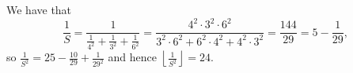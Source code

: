 We have that \[\frac{1}{S}=\frac{1}{\frac{1}{4^2}+\frac{1}{3^2}+\frac{1}{6^2}}=\frac{4^2\cdot3^2\cdot6^2}{3^2\cdot6^2+6^2\cdot4^2+4^2\cdot3^2}=\frac{144}{29}=5-\frac{1}{29},\] so $\frac{1}{S^2}=25-\frac{10}{29}+\frac{1}{29^2}$ and hence $\left\lfloor\frac{1}{S^2}\right\rfloor=\boxed{24}$.